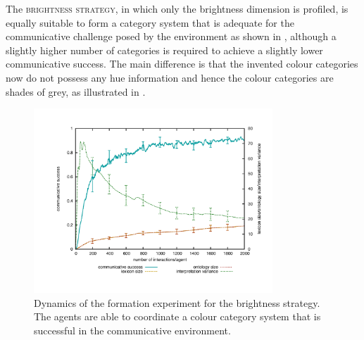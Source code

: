 The \textsc{brightness strategy}, in which only the brightness dimension
is profiled, is equally suitable to form a category system that is
adequate for the communicative challenge posed by the environment as
shown in , although a
slightly higher number of categories is required to achieve a slightly
lower communicative success. The main difference is that the invented
colour categories now do not possess any hue information and hence the
colour categories are shades of grey, as illustrated in .

\begin{figure}[p]
  \begin{center}
    \includegraphics[width=0.8\textwidth]{./basic-operators/figures/formation-brightness.pdf}
    \caption[Dynamics of the formation experiment for the brightness
    strategy]{Dynamics of the formation experiment for the brightness
      strategy. The agents are able to coordinate a colour category
      system that is successful in the communicative environment.}
    \label{f:formation-brightness-dynamics}
  \end{center}
\end{figure}

